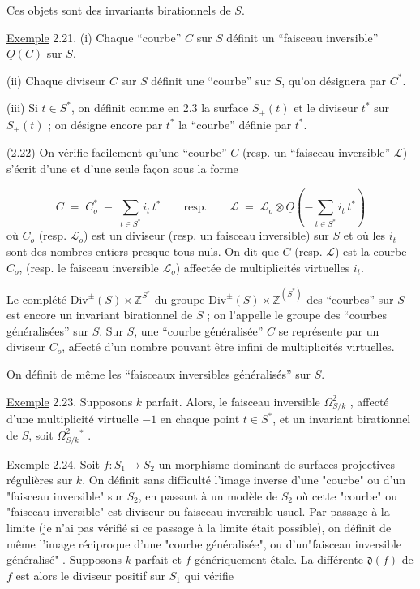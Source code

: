Ces objets sont des invariants birationnels de $S$.

\underline{Exemple} 2.21. (i) Chaque ``courbe'' $C$ sur $S$ définit un ``faisceau inversible'' $\underline{O}(C)$ sur $S$.

(ii) Chaque diviseur $C$ sur $S$ définit une ``courbe'' sur $S$, qu'on désignera par $C^*$.

(iii) Si $t \in S^*$, on définit comme en 2.3 la surface $S_+(t)$ et le diviseur $t^*$ sur $S_+(t)$ ; on désigne encore par $t^*$ la ``courbe'' définie par $t^*$.

(2.22) On vérifie facilement qu'une ``courbe'' $C$ (resp. un ``faisceau inversible'' $\mathcal{L}$) s'écrit d'une et d'une seule façon sous la forme

\begin{equation*}
C \;=\; C_o^* \;-\; \sum_{t \in S^*} i_t \, t^* \qquad \text{resp.} \qquad \mathcal{L} \;=\; \mathcal{L}_o \otimes \underline{O} \left( -\sum_{t \in S^*} i_t \, t^* \right)
\end{equation*}
où $C_o$ (resp. $\mathcal{L}_o$) est un diviseur (resp. un faisceau inversible) sur $S$ et où les $i_t$ sont des nombres entiers presque tous nuls. On dit que $C$ (resp. $\mathcal{L}$) est la courbe $C_o$, (resp. le faisceau inversible $\mathcal{L}_o$) affectée de multiplicités virtuelles $i_t$.

Le complété $\mathrm{Div}^{\pm} (S) \times \mathbb{Z}^{S^*}$ du groupe $\mathrm{Div}^{\pm} (S) \times \mathbb{Z}^{(S^*)}$ des ``courbes'' sur $S$ est encore un invariant birationnel de $S$ ; on l'appelle le groupe des ``courbes généralisées'' sur $S$. Sur $S$, une ``courbe généralisée'' $C$ se représente par un diviseur $C_o$, affecté d'un nombre pouvant être infini de multiplicités virtuelles.

On définit de même les ``faisceaux inversibles généralisés'' sur $S$.



\underline{Exemple} 2.23. Supposons $k$ parfait. Alors, le faisceau inversible $\Omega^2_{S/k}$ , affecté d'une multiplicité virtuelle $-1$ en chaque point $t \in S^*$, et un invariant birationnel de $S$, soit $\Omega^2_{S/k}{}^*$ .

\underline{Exemple} 2.24.  Soit $f : S_1 \longrightarrow S_2$ un morphisme dominant de surfaces projectives régulières sur $k$. On définit sans difficulté l'image inverse d'une "courbe" ou d'un "faisceau inversible" sur $S_2$, en passant à un modèle de $S_2$ où cette "courbe" ou "faisceau inversible" est diviseur ou faisceau inversible usuel. Par passage à la limite (je n'ai pas vérifié si ce passage à la limite était possible), on définit de même l'image réciproque d'une "courbe généralisée", ou d'un"faisceau inversible généralisé" . Supposons $k$ parfait et $f$ génériquement étale. La \underline{différente} $\mathfrak{d}(f)$ de $f$ est alors le diviseur positif sur $S_1$ qui vérifie

